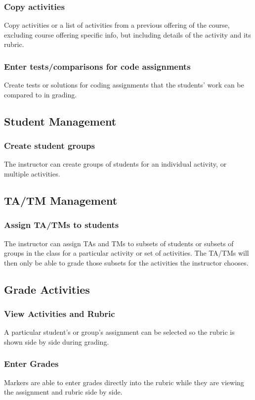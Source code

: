 \documentclass{article}
\begin{document}
\subsubsection{Copy activities}
Copy activities or a list of activities from a previous offering of the course, excluding
course offering specific info, but including details of the activity and its rubric.
\subsubsection{Enter tests/comparisons for code assignments}
Create tests or solutions for coding assignments that the students' work can be compared
to in grading.
\subsection{Student Management}
\subsubsection{Create student groups}
The instructor can create groups of students for an individual activity, or
multiple activities. 
\subsection{TA/TM Management}
\subsubsection{Assign TA/TMs to students \label{AssignTA}}
The instructor can assign TAs and TMs to subsets of students or subsets of 
groups in the class for a particular activity or set of activities. The TA/TMs will then
only be able to grade those subsets for the activities the instructor chooses.
\subsection{Grade Activities \label{grading}}
\subsubsection{View Activities and Rubric}
A particular student's or group's assignment can be selected so the rubric is
shown side by side during grading.
\subsubsection{Enter Grades}
Markers are able to enter grades directly into the rubric while they are viewing
the assignment and rubric side by side.
\end{document}

